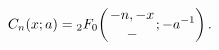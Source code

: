 \[\mathop{C_{n}\/}\nolimits\!\left(x;a\right)=\mathop{{{}_{2}F_{0}}\/}\nolimits%
\!\left({-n,-x\atop-};-a^{-1}\right).\]